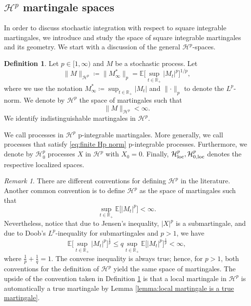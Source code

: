 \documentclass[11pt,a4paper,twoside,openany]{report}
\numberwithin{equation}{section}
\theoremstyle{plain} %
\theoremstyle{definition} %
\newtheorem{definition}[theorem]{Definition}
\theoremstyle{remark} %
\newtheorem{remark}[theorem]{Remark}
\begin{document}
\subsection{\(\mathcal{H}^p\) martingale spaces}
In order to discuss stochastic integration with respect to square integrable martingales, we introduce and study the space of square integrable martingales and its geometry. We start with a discussion of the general \(\mathcal{H}^p\)-spaces.
 
\begin{definition}\label{def:H^p}
 Let \(p\in[1,\infty)\) and \(M\) be a stochastic process. Let
    \begin{equation*}
        \lVert M\rVert_{\mathcal{H}^p}\coloneqq \lVert M_\infty^*\rVert_{p}=\mathbb{E}\Big[\sup_{t\in\mathbb{R}_+}|M_t|^p\Big]^{1/p},
    \end{equation*}
    where we use the notation \(M^*_\infty\coloneqq\sup_{t\in\mathbb{R}_+}|M_t|\) and \(\lVert\cdot\rVert_p\) to denote the \(L^p\)-norm. We denote by \(\mathcal{H}^p\) the space of martingales such that 
    \begin{equation}\label{eq:finite Hp norm}
         \lVert M\rVert_{\mathcal{H}^p}<\infty.
    \end{equation}
    We identify indistinguishable martingales in \(\mathcal{H}^p\).
\end{definition}
We call processes in \(\mathcal{H}^p\) p-integrable martingales. More generally, we call processes that satisfy \eqref{eq:finite Hp norm} p-integrable processes. Furthermore, we denote by \(\mathcal{H}^p_0\) processes \(X\) in \(\mathcal{H}^p\) with \(X_0=0\). Finally, \(\mathcal{H}^p_{\rm{loc}},\mathcal{H}^p_{0,\rm{loc}}\) denotes the respective localized spaces.
\begin{remark}\label{rem:equivalence of H^p conventions}
 There are different conventions for defining \(\mathcal{H}^p\) in the literature. Another common convention is to define \(\mathcal{H}^p\) as the space of martingales such that 
    \begin{equation*}
        \sup_{t\in\mathbb{R}_+}\mathbb{E}\Big[|M_t|^p\Big]<\infty.
    \end{equation*}
    Nevertheless, notice that due to Jensen's inequality, \(|X|^p\) is a submartingale, and due to Doob's \(L^p\)-inequality for submartingales and \(p>1\), we have
    \begin{equation*}
        \mathbb{E}\Big[\sup_{t\in\mathbb{R}_+}|M_t|^p\Big]^{\frac{1}{p}}\leq q\sup_{t\in\mathbb{R}_+}\mathbb{E}\Big[|M_t|^p\Big]^{\frac{1}{p}}<\infty,
    \end{equation*}
    where \(\frac{1}{p}+\frac{1}{q}=1\). The converse inequality is always true; hence, for \(p>1\), both conventions for the definition of \(\mathcal{H}^p\) yield the same space of martingales. The upside of the convention taken in Definition \ref{def:H^p} is that a local martingale in \(\mathcal{H}^p\) is automatically a true martingale by Lemma \ref{lemma:local martingale is a true martingale}.
\end{remark}
\end{document}
